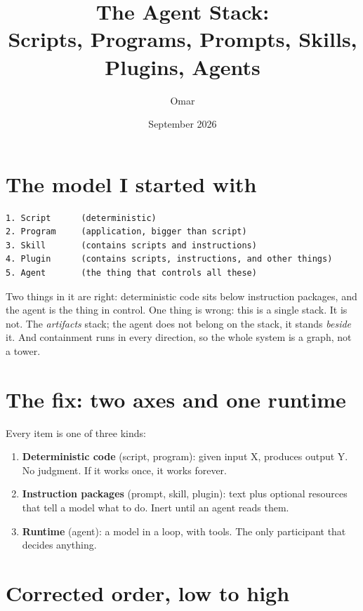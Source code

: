 \documentclass[11pt,a4paper]{article}
\title{The Agent Stack:\\Scripts, Programs, Prompts, Skills, Plugins, Agents}
\author{Omar}
\date{September 2026}
\begin{document}
\maketitle

\section{The model I started with}

\begin{verbatim}
1. Script      (deterministic)
2. Program     (application, bigger than script)
3. Skill       (contains scripts and instructions)
4. Plugin      (contains scripts, instructions, and other things)
5. Agent       (the thing that controls all these)
\end{verbatim}

Two things in it are right: deterministic code sits below instruction
packages, and the agent is the thing in control. One thing is wrong: this is
a single stack. It is not. The \emph{artifacts} stack; the agent does not
belong on the stack, it stands \emph{beside} it. And containment runs in
every direction, so the whole system is a graph, not a tower.

\section{The fix: two axes and one runtime}

Every item is one of three kinds:

\begin{enumerate}
  \item \textbf{Deterministic code} (script, program): given input X,
    produces output Y. No judgment. If it works once, it works forever.
  \item \textbf{Instruction packages} (prompt, skill, plugin): text plus
    optional resources that tell a model what to do. Inert until an agent
    reads them.
  \item \textbf{Runtime} (agent): a model in a loop, with tools. The only
    participant that decides anything.
\end{enumerate}

\section{Corrected order, low to high}
\end{document}
